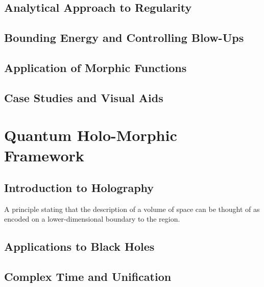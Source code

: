 \documentclass[12pt, a4paper]{article}
\theoremstyle{definitionstyle}
\begin{document}
\subsection{Analytical Approach to Regularity}

\subsection{Bounding Energy and Controlling Blow-Ups}

\subsection{Application of Morphic Functions}

\subsection{Case Studies and Visual Aids}

\section{Quantum Holo-Morphic Framework}
\subsection{Introduction to Holography}
\begin{definition}
A principle stating that the description of a volume of space can be thought of as encoded on a lower-dimensional boundary to the region.
\end{definition}

\subsection{Applications to Black Holes}

\subsection{Complex Time and Unification}
\end{document}
